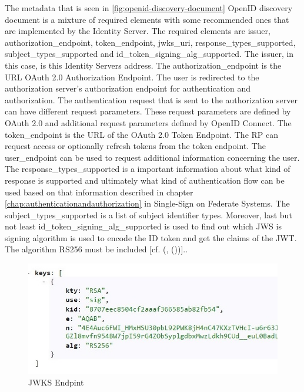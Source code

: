 The metadata that is seen in \ref{fig:openid-discovery-document} OpenID discovery document is a mixture of required elements with some recommended ones that are implemented by the Identity Server. The required elements are issuer, authorization\_endpoint, token\_endpoint, jwks\_uri, response\_types\_supported, subject\_types\_supported and id\_token\_signing\_alg\_supported. The issuer, in this case, is this Identity Servers address. The authorization\_endpoint is the URL OAuth 2.0 Authorization Endpoint. The user is redirected to the authorization server's authorization endpoint for authentication and authorization. The authentication request that is sent to the authorization server can have different request parameters. These request parameters are defined by OAuth 2.0 and additional request parameters defined by OpenID Connect. The token\_endpoint is the URL of the OAuth 2.0 Token Endpoint. The RP can request access or optionally refresh tokens from the token endpoint. The user\_endpoint can be used to request additional information concerning the user. The response\_types\_supported is a important information about what kind of response is supported and ultimately what kind of authentication flow can be used based on that information described in chapter \ref{chap:authenticationandauthorization} in Single-Sign on Federate Systems. The subject\_types\_supported is a list of subject identifier types. Moreover, last but not least id\_token\_signing\_alg\_supported is used to find out which JWS is signing algorithm is used to encode the ID token and get the claims of the JWT. The algorithm RS256 must be included [cf. (\cite{Sakimura:OIDCC}, (\cite{Sakimura:OIDCD}))].. 

\begin{figure}[h]
	\centering
	\includegraphics[width=0.7\linewidth]{images/jwkDiscovoryDocument}
	\caption{JWKS Endpint}
	\label{fig:jwkdiscovorydocument}
\end{figure}

